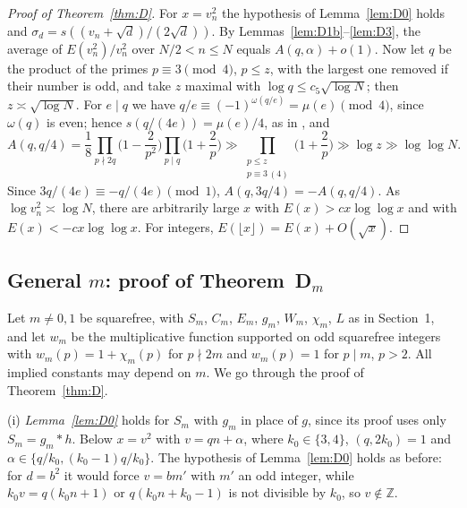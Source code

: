 \documentclass[11pt]{amsart}
\theoremstyle{remark}
\begin{document}
\begin{proof}[Proof of Theorem~\ref{thm:D}]
For $x=v_n^2$ the hypothesis of Lemma~\ref{lem:D0} holds and $\sigma_d=s((v_n+\sqrt d)/(2\sqrt d))$. By Lemmas~\ref{lem:D1b}--\ref{lem:D3}, the average of $E(v_n^2)/v_n^2$ over $N/2<n\le N$ equals $A(q,\alpha)+o(1)$. Now let $q$ be the product of the primes $p\equiv3\pmod4$, $p\le z$, with the largest one removed if their number is odd, and take $z$ maximal with $\log q\le c_5\sqrt{\log N}$; then $z\asymp\sqrt{\log N}$. For $e\mid q$ we have $q/e\equiv(-1)^{\omega(q/e)}=\mu(e)\pmod4$, since $\omega(q)$ is even; hence $s(q/(4e))=\mu(e)/4$, as in \cite{Mo}, and
\[
A(q,q/4)=\frac18\prod_{p\nmid2q}\Big(1-\frac2{p^2}\Big)\prod_{p\mid q}\Big(1+\frac2p\Big)\gg\prod_{\substack{p\le z\\ p\equiv3\,(4)}}\Big(1+\frac2p\Big)\gg\log z\gg\log\log N.
\]
Since $3q/(4e)\equiv-q/(4e)\pmod1$, $A(q,3q/4)=-A(q,q/4)$. As $\log v_n^2\asymp\log N$, there are arbitrarily large $x$ with $E(x)>cx\log\log x$ and with $E(x)<-cx\log\log x$. For integers, $E(\lfloor x\rfloor)=E(x)+O(\sqrt x)$.
\end{proof}

\subsection{General $m$: proof of Theorem~D$_m$}\label{sec:Dm}
Let $m\neq0,1$ be squarefree, with $S_m$, $C_m$, $E_m$, $g_m$, $W_m$, $\chi_m$, $L$ as in Section~1, and let $w_m$ be the multiplicative function supported on odd squarefree integers with $w_m(p)=1+\chi_m(p)$ for $p\nmid2m$ and $w_m(p)=1$ for $p\mid m$, $p>2$. All implied constants may depend on $m$. We go through the proof of Theorem~\ref{thm:D}.

(i) \emph{Lemma~\ref{lem:D0}} holds for $S_m$ with $g_m$ in place of $g$, since its proof uses only $S_m=g_m*h$. Below $x=v^2$ with $v=qn+\alpha$, where $k_0\in\{3,4\}$, $(q,2k_0)=1$ and $\alpha\in\{q/k_0,(k_0-1)q/k_0\}$. The hypothesis of Lemma~\ref{lem:D0} holds as before: for $d=b^2$ it would force $v=bm'$ with $m'$ an odd integer, while $k_0v=q(k_0n+1)$ or $q(k_0n+k_0-1)$ is not divisible by $k_0$, so $v\notin\mathbb Z$.
\end{document}
